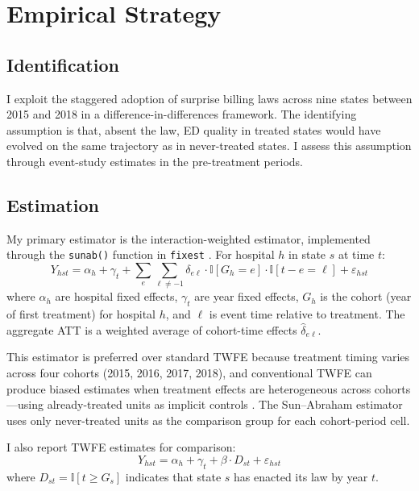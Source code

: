 \documentclass[12pt]{article}
\newcommand{\ind}{\mathbb{I}}
\begin{document}
\section{Empirical Strategy}
\label{sec:strategy}

\subsection{Identification}

I exploit the staggered adoption of surprise billing laws across nine states between 2015 and 2018 in a difference-in-differences framework. The identifying assumption is that, absent the law, ED quality in treated states would have evolved on the same trajectory as in never-treated states. I assess this assumption through event-study estimates in the pre-treatment periods.

\subsection{Estimation}

My primary estimator is the \citet{sun2021estimating} interaction-weighted estimator, implemented through the \texttt{sunab()} function in \texttt{fixest} \citep{borusyak2024}. For hospital $h$ in state $s$ at time $t$:
\begin{equation}
Y_{hst} = \alpha_h + \gamma_t + \sum_{e} \sum_{\ell \neq -1} \delta_{e\ell} \cdot \ind[G_h = e] \cdot \ind[t - e = \ell] + \varepsilon_{hst}
\label{eq:sa}
\end{equation}
where $\alpha_h$ are hospital fixed effects, $\gamma_t$ are year fixed effects, $G_h$ is the cohort (year of first treatment) for hospital $h$, and $\ell$ is event time relative to treatment. The aggregate ATT is a weighted average of cohort-time effects $\hat{\delta}_{e\ell}$.

This estimator is preferred over standard TWFE because treatment timing varies across four cohorts (2015, 2016, 2017, 2018), and conventional TWFE can produce biased estimates when treatment effects are heterogeneous across cohorts---using already-treated units as implicit controls \citep{goodmanBacon2021}. The Sun--Abraham estimator uses only never-treated units as the comparison group for each cohort-period cell.

I also report TWFE estimates for comparison:
\begin{equation}
Y_{hst} = \alpha_h + \gamma_t + \beta \cdot D_{st} + \varepsilon_{hst}
\label{eq:twfe}
\end{equation}
where $D_{st} = \ind[t \geq G_s]$ indicates that state $s$ has enacted its law by year $t$.
\end{document}
